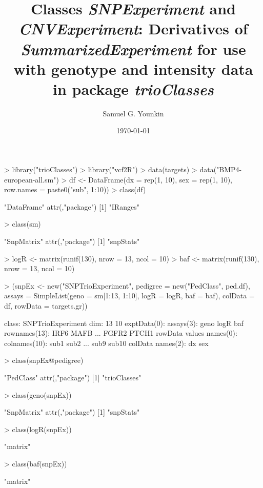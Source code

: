 \documentclass[10pt]{article}
\title{Classes \emph{SNPExperiment} and \emph{CNVExperiment}: Derivatives of \emph{SummarizedExperiment} for use with genotype and intensity data in package \emph{trioClasses}}
\author{Samuel G. Younkin}
\date{\today}
\begin{document}
\setlength{\parskip}{0.2\baselineskip}
\setlength{\parindent}{0pt}
\maketitle
\begin{Schunk}
\begin{Sinput}
> library("trioClasses")
> library("vcf2R")
> data(targets)
> data("BMP4-european-all.sm")
> df <- DataFrame(dx = rep(1, 10), sex = rep(1, 10), row.names = paste0("sub", 
     1:10))
> class(df)
\end{Sinput}
\begin{Soutput}
[1] "DataFrame"
attr(,"package")
[1] "IRanges"
\end{Soutput}
\begin{Sinput}
> class(sm)
\end{Sinput}
\begin{Soutput}
[1] "SnpMatrix"
attr(,"package")
[1] "snpStats"
\end{Soutput}
\begin{Sinput}
> logR <- matrix(runif(130), nrow = 13, ncol = 10)
> baf <- matrix(runif(130), nrow = 13, ncol = 10)
\end{Sinput}
\end{Schunk}
\begin{Schunk}
\begin{Sinput}
> (snpEx <- new("SNPTrioExperiment", pedigree = new("PedClass", 
     ped.df), assays = SimpleList(geno = sm[1:13, 1:10], 
     logR = logR, baf = baf), colData = df, rowData = targets.gr))
\end{Sinput}
\begin{Soutput}
class: SNPTrioExperiment 
dim: 13 10 
exptData(0):
assays(3): geno logR baf
rownames(13): IRF6 MAFB ... FGFR2 PTCH1
rowData values names(0):
colnames(10): sub1 sub2 ... sub9 sub10
colData names(2): dx sex
\end{Soutput}
\end{Schunk}
\begin{Schunk}
\begin{Sinput}
> class(snpEx@pedigree)
\end{Sinput}
\begin{Soutput}
[1] "PedClass"
attr(,"package")
[1] "trioClasses"
\end{Soutput}
\begin{Sinput}
> class(geno(snpEx))
\end{Sinput}
\begin{Soutput}
[1] "SnpMatrix"
attr(,"package")
[1] "snpStats"
\end{Soutput}
\begin{Sinput}
> class(logR(snpEx))
\end{Sinput}
\begin{Soutput}
[1] "matrix"
\end{Soutput}
\begin{Sinput}
> class(baf(snpEx))
\end{Sinput}
\begin{Soutput}
[1] "matrix"
\end{Soutput}
\end{Schunk}
\end{document}
